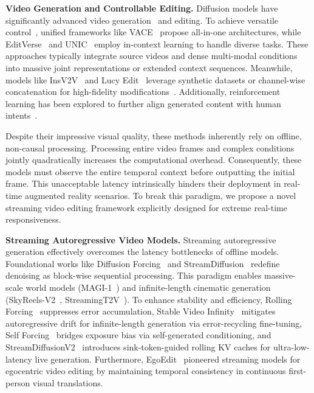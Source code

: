 \documentclass{llmxive}
\begin{document}
\noindent \textbf{Video Generation and Controllable Editing.}
\label{subsec:video_editing}
Diffusion models have significantly advanced video generation~\cite{singer2022make,blattmann2023stable,yang2024cogvideox, ma2026group, ma2024followpose, ma2025followcreation, ma2026fastvmt, ma2025followyourmotion} and editing. To achieve versatile control~\cite{ma2025controllable}, unified frameworks like VACE~\cite{jiang2025vace} propose all-in-one architectures, while EditVerse~\cite{ju2025editverse} and UNIC~\cite{ye2025unic} employ in-context learning to handle diverse tasks. These approaches typically integrate source videos and dense multi-modal conditions into massive joint representations or extended context sequences. Meanwhile, models like InsV2V~\cite{cheng2023consistent} and Lucy Edit~\cite{decart2025lucyedit} leverage synthetic datasets or channel-wise concatenation for high-fidelity modifications~\cite{mokady2023null}. Additionally, reinforcement learning has been explored to further align generated content with human intents~\cite{black2023training}.

Despite their impressive visual quality, these methods inherently rely on offline, non-causal processing. Processing entire video frames and complex conditions jointly quadratically increases the computational overhead. Consequently, these models must observe the entire temporal context before outputting the initial frame. This unacceptable latency intrinsically hinders their deployment in real-time augmented reality scenarios. To break this paradigm, we propose a novel streaming video editing framework explicitly designed for extreme real-time responsiveness.

\noindent \textbf{Streaming Autoregressive Video Models.}
\label{subsec:streaming_models}
Streaming autoregressive generation effectively overcomes the latency bottlenecks of offline models. Foundational works like Diffusion Forcing~\cite{chen2024diffusion} and StreamDiffusion~\cite{kodaira2025streamdiffusion} redefine denoising as block-wise sequential processing. This paradigm enables massive-scale world models (MAGI-1~\cite{teng2025magi}) and infinite-length cinematic generation (SkyReels-V2~\cite{chen2025skyreels}, StreamingT2V~\cite{henschel2025streamingt2v}). To enhance stability and efficiency, Rolling Forcing~\cite{liu2025rolling} suppresses error accumulation, Stable Video Infinity~\cite{li2025stable} mitigates autoregressive drift for infinite-length generation via error-recycling fine-tuning, Self Forcing~\cite{huang2025self} bridges exposure bias via self-generated conditioning, and StreamDiffusionV2~\cite{feng2025streamdiffusionv2} introduces sink-token-guided rolling KV caches for ultra-low-latency live generation. Furthermore, EgoEdit~\cite{li2025egoedit} pioneered streaming models for egocentric video editing by maintaining temporal consistency in continuous first-person visual translations.
\end{document}
